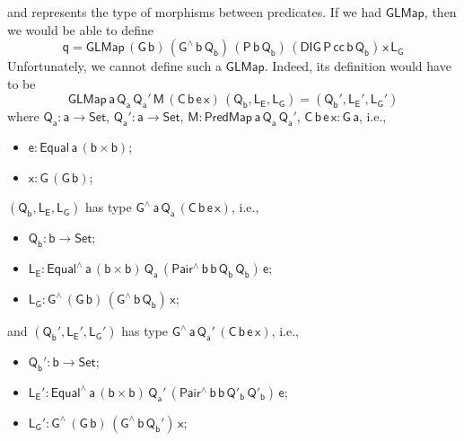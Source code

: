 \documentclass[acmsmall,screen,review,anonymous]{acmart}
\theoremstyle{definition}
\begin{document}
and represents the type of morphisms between predicates.
If we had $\mathsf{GLMap}$, then we would be able to define
\[
\mathsf{q = GLMap\,(G\,b)\,(G^{\wedge}\,b\,Q_b)\,(P\,b\,Q_b)\,(DIG\,P\,cc\,b\,Q_b)\,x\,L_G}
\]
Unfortunately, we cannot define such a $\mathsf{GLMap}$.
Indeed, its definition would have to be
\[
\mathsf{GLMap\,a\,Q_a\,Q_a'\,M\,(C\,b\,e\,x)\,(Q_b, L_E, L_G) = (Q_b', L_E', L_G')}
\]
where $\mathsf{Q_a : a \to Set}$, $\mathsf{Q_a' : a \to Set}$,
$\mathsf{M : PredMap\,a\,Q_a\,Q_a'}$,
$\mathsf{C\,b\,e\,x : G\,a}$, i.e.,
\begin{itemize}
\item $\mathsf{e : Equal\,a\,(b \times b)}$;
\item $\mathsf{x : G\,(G\,b)}$;
\end{itemize}
$\mathsf{(Q_b, L_E, L_G)}$ has type $\mathsf{G^{\wedge}\,a\,Q_a\,(C\,b\,e\,x)}$, i.e.,
\begin{itemize}
\item $\mathsf{Q_b : b \to Set}$;
\item $\mathsf{L_E : Equal^{\wedge}\,a\,(b \times b)\,Q_a\,(Pair^{\wedge}\,b\,b\,Q_b\,Q_b)\,e}$;
\item $\mathsf{L_G : G^{\wedge}\,(G\,b)\,(G^{\wedge}\,b\,Q_b)\,x}$;
\end{itemize}
and $\mathsf{(Q_b', L_E', L_G')}$ has type $\mathsf{G^{\wedge}\,a\,Q_a'\,(C\,b\,e\,x)}$, i.e.,
\begin{itemize}
\item $\mathsf{Q_b' : b \to Set}$;
\item $\mathsf{L_E' : Equal^{\wedge}\,a\,(b \times b)\,Q_a'\,(Pair^{\wedge}\,b\,b\,Q'_b\,Q'_b)\,e}$;
\item $\mathsf{L_G' : G^{\wedge}\,(G\,b)\,(G^{\wedge}\,b\,Q_b')\,x}$;
\end{itemize}
\end{document}
